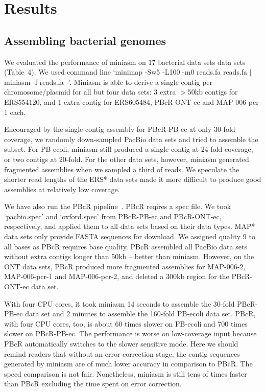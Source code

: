 \documentclass{bioinfo}
\begin{document}
\section{Results}

\subsection{Assembling bacterial genomes}

We evaluated the performance of miniasm on 17 bacterial data sets data sets
(Table~4). We used command line `minimap -Sw5 -L100 -m0 reads.fa reads.fa $|$
miniasm -f reads.fa -'. Miniasm is able to derive a single contig per
chromosome/plasmid for all but four data sets: 3 extra $>$50kb contigs for
ERS554120, and 1 extra contig for ERS605484, PBcR-ONT-ec and MAP-006-pcr-1
each. 

Encouraged by the single-contig assembly for PBcR-PB-ec at only 30-fold
coverage, we randomly down-sampled PacBio data sets and tried to assemble the
subset. For PB-ecoli, miniasm still produced a single contig at 24-fold
coverage, or two contigs at 20-fold. For the other data sets, however, miniasm
generated fragmented assemblies when we sampled a third of reads. We speculate
the shorter read lengths of the ERS* data sets made it more difficult to
produce good assemblies at relatively low coverage.

We have also run the PBcR pipeline~\citep{Berlin:2015xy}. PBcR reqires a spec
file. We took `pacbio.spec' and `oxford.spec' from PBcR-PB-ec and PBcR-ONT-ec,
respectively, and applied them to all data sets based on their data types. MAP*
data sets only provide FASTA sequences for download. We assigned quality 9 to
all bases as PBcR requires base quality. PBcR assembled all PacBio data sets
without extra contigs longer than 50kb -- better than miniasm. However, on the
ONT data sets, PBcR produced more fragmented assemblies for MAP-006-2,
MAP-006-pcr-1 and MAP-006-pcr-2, and deleted a 300kb region for the PBcR-ONT-ec
data set. 

With four CPU cores, it took miniasm 14 seconds to assemble the 30-fold
PBcR-PB-ec data set and 2 minutes to assemble the 160-fold PB-ecoli data set.
PBcR, with four CPU cores, too, is about 60 times slower on PB-ecoli and 700
times slower on PBcR-PB-ec.  The performance is worse on low-coverage input
because PBcR automatically switches to the slower sensitive mode. Here we
should remind readers that without an error correction stage, the contig
sequences generated by miniasm are of much lower accuracy in comparison to
PBcR. The speed comparison is not fair. Nonetheless, miniasm is still tens of
times faster than PBcR excluding the time spent on error correction.
\end{document}
